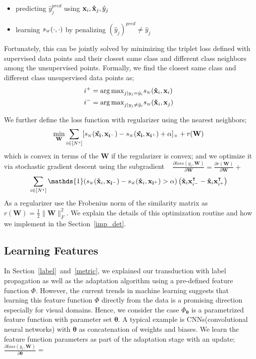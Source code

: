\begin{itemize}
\item predicting $\hat{y}^{pred}_j$ using $\mathbf{x}_i, \mathbf{\hat{x}}_j, \hat{y}_j$
\item learning $\sw(\cdot,\cdot)$ by penalizing  $(\hat{y}_j)^{pred} \neq \hat{y}_j$ 
\end{itemize}

Fortunately, this can be jointly solved by minimizing the triplet loss defined with supervised data points and their closest same class and different class neighbors among the unsupervised points. Formally, we find the closest same class and different class unsupervised data points as;
\begin{equation}
\begin{aligned}
&i^{+} = {\arg\max}_{j | y_j = \hat{y}_i} \sw(\xsi, \xui) \\
&i^{-} = {\arg\max}_{j | y_j \neq \hat{y}_i} \sw(\xsi,\xuj) 
\label{sup_nn}
\end{aligned}
\end{equation}

We further define the loss function with regularizer using the nearest neighbors;
\begin{equation}
\min_{\mathbf{W}} \sum_{i \in [N^s]} [\sw(\mathbf{\hat{x_i}},\mathbf{x_{i^-}}) - \sw(\mathbf{\hat{x_i}},\mathbf{x_{i^+}}) + \alpha]_{+} + r(\mathbf{W})
\end{equation}
which is convex in terms of the $\mathbf{W}$ if the regularizer is convex; and we optimize it via stochastic gradient descent using the subgradient \
\mbox{$\frac{\partial loss (y_i, \mathbf{W})}{\partial \mathbf{W}} = \frac{\partial r ( \mathbf{W})}{\partial \mathbf{W}} + $}
\begin{equation}
\sum_{i \in [N^s]} \mathds{1}(\sw(\xsi,\mathbf{x_{i^-}}) - \sw(\xsi,\mathbf{x_{i^+}})>\alpha) \left( \xsi\mathbf{x}^\intercal_{i^-} - \xsi \mathbf{x}^\intercal_{i^+}  \right)  
\label{gradw}
\end{equation}
As a regularizer use the Frobenius norm of the similarity matrix as $r(\mathbf{W})=\frac{1}{2}\|\mathbf{W}\|_F^2$. We explain the details of this optimization routine and how we implement in the Section~\ref{imp_det}.
\subsection{Learning Features}
In Section~\ref{label}~and~\ref{metric}, we explained our transduction with label propagation as well as the adaptation algorithm using a pre-defined feature function $\Phi$. However, the current trends in machine learning suggests that learning this feature function $\Phi$ directly from the data  is a promising direction especially for visual domains. Hence, we consider the case $\Phi_{\mathbf{\theta}}$ is a parametrized feature function with parameter set $\mathbf{\theta}$. A typical example is CNNs(convolutional neural networks) with $\mathbf{\theta}$ as concatenation of weights and biases. We learn the feature function parameters as part of the adaptation stage with an update; $\frac{\partial loss (y_i, \mathbf{W})}{\partial \mathbf{\theta}} =$

